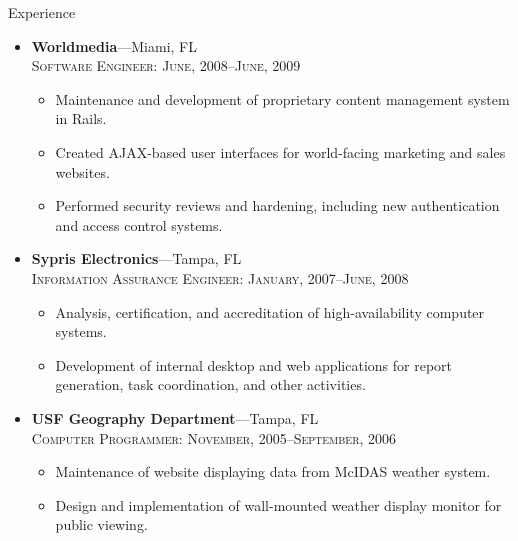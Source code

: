 \documentclass[11pt,oneside]{article}
\newenvironment{ressection}[1]{
	\vspace{2pt}
	{\selectfont\Large#1}
	\begin{itemize}
	\vspace{3pt}
}{
	\end{itemize}
}
\newcommand{\ressubitem}[1]{
	\vspace{-1pt}
	\item \begin{flushleft} #1 \end{flushleft}
}
\newcommand{\resbigitem}[3]{
	\vspace{-5pt}
	\item
	\textbf{#1}---#2 \\
	\textsc{#3}
}
\newenvironment{ressubsec}[3]{
	\resbigitem{#1}{#2}{#3}
	\vspace{-2pt}
	\begin{itemize}
}{
	\end{itemize}
}
\begin{document}
\begin{ressection}{Experience}
	\begin{ressubsec}{Worldmedia}{Miami, FL}{Software Engineer: June, 2008--June, 2009}
		\ressubitem{Maintenance and development of proprietary content management system in Rails.}
		\ressubitem{Created AJAX-based user interfaces for world-facing marketing and sales websites.}
		\ressubitem{Performed security reviews and hardening, including new authentication and access control systems.}
	\end{ressubsec}
	
	\begin{ressubsec}{Sypris Electronics}{Tampa, FL}{Information Assurance Engineer: January, 2007--June, 2008}
		\ressubitem{Analysis, certification, and accreditation of high-availability computer systems.}
		\ressubitem{Development of internal desktop and web applications for report generation, task coordination, and other activities.}
	\end{ressubsec}

	\begin{ressubsec}{USF Geography Department}{Tampa, FL}{Computer Programmer: November, 2005--September, 2006}
		\ressubitem{Maintenance of website displaying data from McIDAS weather system.}
		\ressubitem{Design and implementation of wall-mounted weather display monitor for public viewing.}
	\end{ressubsec}

	

\end{ressection}
\end{document}
